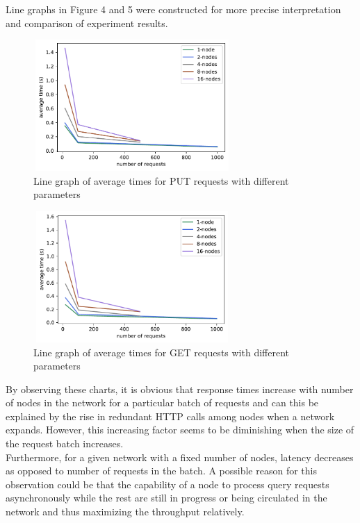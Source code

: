 \documentclass[
    a4paper,
    twocolumn,
]{article}
\begin{document}
Line graphs in Figure 4 and 5 were constructed for more precise interpretation and comparison of experiment results.\\

\setlength{\intextsep}{7pt plus 2pt minus 0pt}
\begin{figure}[!ht]
	\centering
	\includegraphics[width=7.5cm, height=5cm]{put_line.pdf}
	\caption{Line graph of average times for PUT requests with different parameters}
\end{figure}

\setlength{\intextsep}{5pt plus 2pt minus 0pt}
\begin{figure}[!ht]
	\centering
	\includegraphics[width=7.5cm, height=5cm]{get_line.pdf}
	\caption{Line graph of average times for GET requests with different parameters}
\end{figure}

By observing these charts, it is obvious that response times increase with number of nodes in the network for a particular batch of requests and can this be explained by the rise in redundant HTTP calls among nodes when a network expands. However, this increasing factor seems to be diminishing when the size of the request batch increases. \\

Furthermore, for a given network with a fixed number of nodes, latency decreases as opposed to number of requests in the batch. A possible reason for this observation could be that the capability of a node to process query requests asynchronously while the rest are still in progress or being circulated in the network and thus maximizing the throughput relatively.\\
\end{document}
